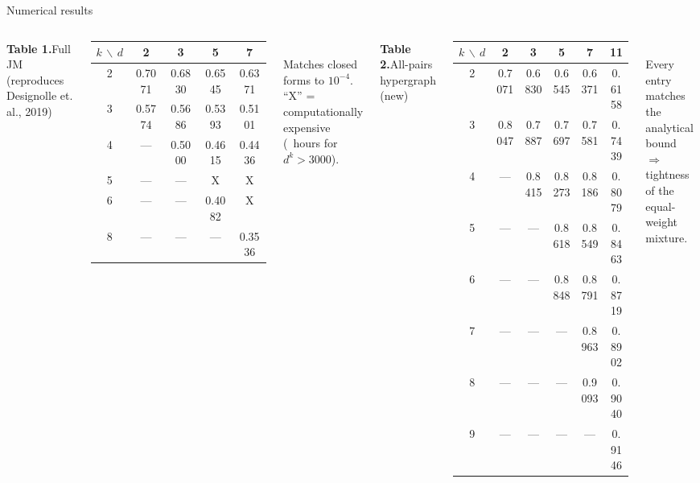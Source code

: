 \documentclass[10pt,aspectratio=169]{beamer}
\begin{document}
\begin{frame}{Numerical results}
  \begin{columns}[T]
    \centering
    \textbf{Table 1.}\;Full JM (reproduces Designolle et. al., 2019)\\[0.4em]
    \scriptsize
    \begin{tabular}{c|cccc}
      \hline
      $k\,\backslash\,d$ & 2 & 3 & 5 & 7 \\
      \hline
      2 & 0.7071 & 0.6830 & 0.6545 & 0.6371 \\
      3 & 0.5774 & 0.5686 & 0.5393 & 0.5101 \\
      4 & ---    & 0.5000 & 0.4615 & 0.4436 \\
      5 & ---    & ---    & X      & X      \\
      6 & ---    & ---    & 0.4082 & X      \\
      8 & ---    & ---    & ---    & 0.3536 \\
      \hline
    \end{tabular}\\[0.5em]
    \footnotesize Matches closed forms to $10^{-4}$.
    \\``X'' = computationally expensive (~hours for $d^k > 3000$).

    \centering
    \textbf{Table 2.}\;All-pairs hypergraph (new)\\[0.4em]
    \scriptsize
    \begin{tabular}{c|ccccc}
      \hline
      $k\,\backslash\,d$ & 2 & 3 & 5 & 7 & 11 \\
      \hline
      2 & 0.7071 & 0.6830 & 0.6545 & 0.6371 & 0.6158 \\
      3 & 0.8047 & 0.7887 & 0.7697 & 0.7581 & 0.7439 \\
      4 & ---    & 0.8415 & 0.8273 & 0.8186 & 0.8079 \\
      5 & ---    & ---    & 0.8618 & 0.8549 & 0.8463 \\
      6 & ---    & ---    & 0.8848 & 0.8791 & 0.8719 \\
      7 & ---    & ---    & ---    & 0.8963 & 0.8902 \\
      8 & ---    & ---    & ---    & 0.9093 & 0.9040 \\
      9 & ---    & ---    & ---    & ---    & 0.9146 \\
      \hline
    \end{tabular}\\[0.5em]
    \footnotesize Every entry matches the analytical bound\\
    $\Rightarrow$ \alert{tightness} of the equal-weight mixture.
  \end{columns}
\end{frame}
\end{document}
